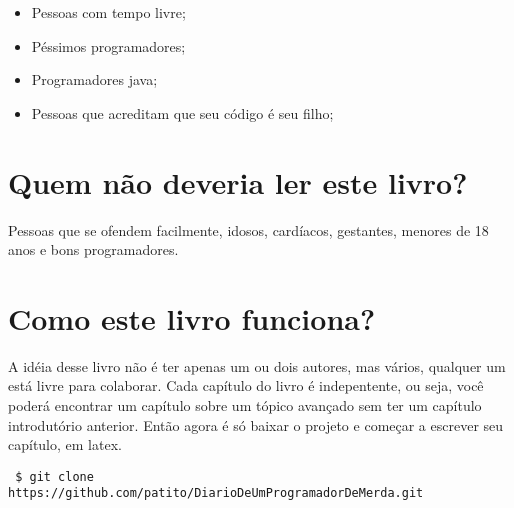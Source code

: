 \begin{itemize}
  \item Pessoas com tempo livre;
  \item Péssimos programadores;
  \item Programadores java;
  \item Pessoas que acreditam que seu código é seu filho;
\end{itemize}

\section{Quem não deveria ler este livro?}

Pessoas que se ofendem facilmente, idosos, cardíacos, gestantes, menores de 18 anos e bons programadores.

\section{Como este livro funciona?}

A idéia desse livro não é ter apenas um ou dois autores, mas vários, qualquer um está livre para colaborar. Cada capítulo do livro 
é indepentente, ou seja, você poderá encontrar um capítulo sobre um tópico avançado sem ter um capítulo introdutório anterior. 
Então agora é só baixar o projeto e começar a escrever seu capítulo, em latex.

\begin{verbatim}
 $ git clone https://github.com/patito/DiarioDeUmProgramadorDeMerda.git
\end{verbatim}




